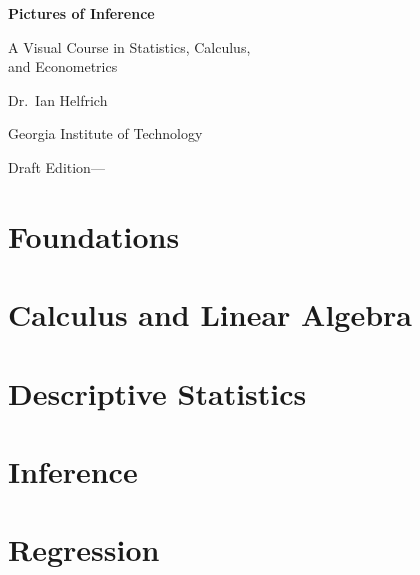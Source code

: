 \documentclass[11pt,twoside,openany]{book}
\begin{document}
\begin{titlepage}
\centering
\vspace*{2in}
{\Huge\bfseries Pictures of Inference\par}
\vspace{0.4in}
{\Large A Visual Course in Statistics, Calculus,\\ and Econometrics\par}
\vspace{0.8in}
{\large Dr.\ Ian Helfrich\par}
\vspace{0.15in}
{\normalsize Georgia Institute of Technology\par}
\vspace{2in}
{\normalsize Draft Edition\quad---\par}
\end{titlepage}

\frontmatter
\tableofcontents

\mainmatter

\part{Foundations}





\part{Calculus and Linear Algebra}





\part{Descriptive Statistics}



\part{Inference}



\part{Regression}




\end{document}
